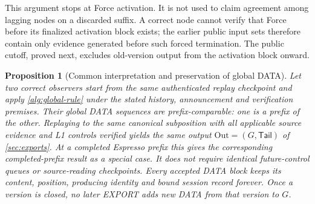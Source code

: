 \documentclass[11pt,a4paper]{article}
\newtheorem{proposition}[proposition]{Proposition}
\begin{document}
This argument stops at Force activation. It is not used to claim
agreement among lagging nodes on a discarded suffix. A correct node
cannot verify that Force before its finalized activation block exists;
the earlier public input sets therefore contain only evidence generated
before such forced termination. The public cutoff, proved next, excludes
old-version output from the activation block onward.

\begin{proposition}[Common interpretation and preservation of global DATA]
\label{prop:global-prefix}
Let two correct observers start from the same authenticated replay
checkpoint and apply \cref{alg:global-rule} under the stated history,
announcement and verification premises. Their global DATA sequences are
prefix-comparable: one is a prefix of the other. Replaying to the same canonical subposition with all applicable source
evidence and L1 controls verified yields the same output
$\mathrm{Out}=(G,\mathsf{Tail})$ of \cref{sec:exports}. At a completed Espresso prefix
this gives the corresponding completed-prefix result as a special case. It does not require identical
future-control queues or source-reading checkpoints. Every accepted DATA
block keeps its content, position, producing identity and bound
session record forever. Once a version is closed, no
later EXPORT adds new DATA from that version to $G$.
\end{proposition}
\end{document}
